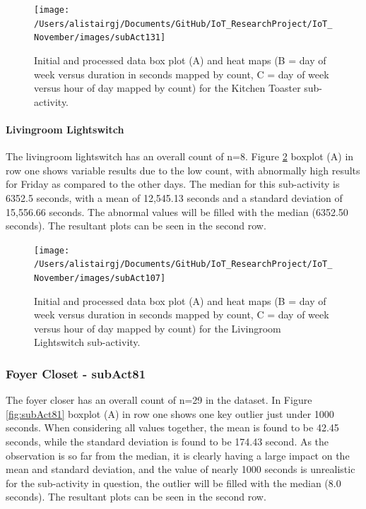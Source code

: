 \documentclass[11pt,]{article}
\let\oldparagraph\paragraph
\renewcommand{\paragraph}[1]{\oldparagraph{#1}\mbox{}}
\begin{document}
\begin{figure}[H]

{\centering \texttt{[image: /Users/alistairgj/Documents/GitHub/IoT\_ResearchProject/IoT\_November/images/subAct131]} 

}

\caption{Initial and processed data box plot (A) and heat maps (B = day of week versus duration in seconds mapped by count, C = day of week versus hour of day mapped by count) for the Kitchen Toaster sub-activity.}\label{fig:subAct131}
\end{figure}

\hypertarget{livingroom-lightswitch}{%
\paragraph{Livingroom Lightswitch}\label{livingroom-lightswitch}}

The livingroom lightswitch has an overall count of n=8. Figure
\ref{fig:subAct107} boxplot (A) in row one shows variable results due to
the low count, with abnormally high results for Friday as compared to
the other days. The median for this sub-activity is 6352.5 seconds, with
a mean of 12,545.13 seconds and a standard deviation of 15,556.66
seconds. The abnormal values will be filled with the median (6352.50
seconds). The resultant plots can be seen in the second row.

\begin{figure}[H]

{\centering \texttt{[image: /Users/alistairgj/Documents/GitHub/IoT\_ResearchProject/IoT\_November/images/subAct107]} 

}

\caption{Initial and processed data box plot (A) and heat maps (B = day of week versus duration in seconds mapped by count, C = day of week versus hour of day mapped by count) for the Livingroom Lightswitch sub-activity.}\label{fig:subAct107}
\end{figure}

\hypertarget{foyer-closet---subact81}{%
\subsubsection{Foyer Closet - subAct81}\label{foyer-closet---subact81}}

The foyer closer has an overall count of n=29 in the dataset. In Figure
\ref{fig:subAct81} boxplot (A) in row one shows one key outlier just
under 1000 seconds. When considering all values together, the mean is
found to be 42.45 seconds, while the standard deviation is found to be
174.43 second. As the observation is so far from the median, it is
clearly having a large impact on the mean and standard deviation, and
the value of nearly 1000 seconds is unrealistic for the sub-activity in
question, the outlier will be filled with the median (8.0 seconds). The
resultant plots can be seen in the second row.
\end{document}
